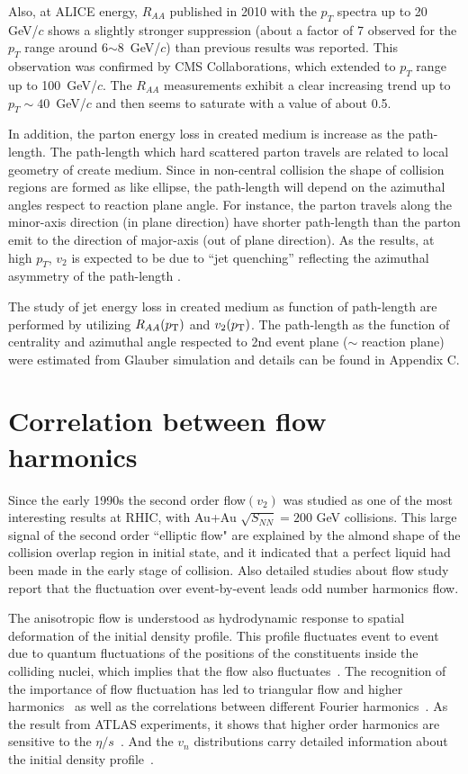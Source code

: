    Also, at ALICE energy, $R_{AA}$ published in 2010 with the $p_T$ spectra up to 20 GeV/$c$ shows a slightly stronger suppression (about a factor of 7 observed for the $p_T$ range around 6$\sim$8~GeV/$c$) than previous results was reported.  This observation was confirmed by CMS Collaborations, which extended to $p_T$ range up to 100~GeV/$c$. The $R_{AA}$ measurements exhibit a clear increasing trend up to $p_T \sim 40$~GeV/$c$ and then seems to saturate with a value of about 0.5. 
   
   
    In addition, the parton energy loss in created medium is increase as the path-length. The path-length which hard scattered parton travels are related to local geometry of create medium. Since in non-central collision the shape of collision regions are formed as like ellipse, the path-length will depend on the azimuthal angles respect to reaction plane angle. For instance, the parton travels along the minor-axis direction (in plane direction) have shorter path-length than the parton emit to the direction of major-axis (out of plane direction). As the results, at high $p_T$, $v_2$ is expected to be due to ``jet quenching'' reflecting the azimuthal asymmetry of the path-length \cite{Christiansen:2016uaq}.
    
    The study of jet energy loss in created medium as function of path-length are performed by utilizing $R_{AA}(p_{\rm{T}})$ and $v_2(p_{\rm{T}})$.  The path-length as the function of centrality and azimuthal angle respected to 2nd event plane ($\sim$ reaction plane) were estimated from Glauber simulation and details can be found in Appendix C.    
    
    
\clearpage
\section{Correlation between flow harmonics}

 Since the early 1990s the second order flow$(v_2)$ was studied as one of the most interesting results at RHIC, with Au+Au $\sqrt{S_{NN}}=200$ GeV collisions. This large signal of  the second order ``elliptic flow" are explained by the almond shape of the collision overlap region in initial state, and it indicated that a perfect liquid had been made in the early stage of collision. Also detailed studies about flow study report that the fluctuation over event-by-event leads odd number harmonics flow. 
 
 The anisotropic flow is understood as hydrodynamic response to spatial deformation of the initial density profile.
This profile fluctuates event to event due to quantum fluctuations of the positions of the constituents inside the colliding nuclei, which implies that the flow also fluctuates~\cite{Miller:2003kd,Alver:2006wh}.
The recognition of the importance of flow fluctuation has led to triangular flow and higher harmonics~\cite{Alver:2010gr,ALICE:2011ab} as well as the correlations between different Fourier harmonics~\cite{Aad:2014fla}.
 As the result from ATLAS experiments, it shows that higher order harmonics are sensitive to the $\eta/s$~\cite{Luzum:2012wu}.
And the $v_{n}$ distributions carry detailed information about the initial density profile~\cite{Renk:2014jja,Yan:2014nsa}.

